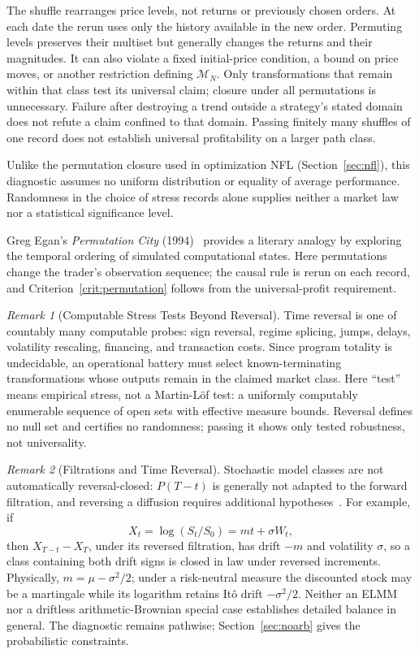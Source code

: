 \documentclass[aps,pra,reprint,superscriptaddress,amsmath,amssymb,floatfix]{revtex4-2}
\theoremstyle{plain}
\theoremstyle{definition}
\theoremstyle{remark}
\newtheorem{remark}{Remark}
\begin{document}
The shuffle rearranges price levels, not returns or previously chosen orders.
At each date the rerun uses only the history available in the new order.
Permuting levels preserves their multiset but generally changes the returns
and their magnitudes. It can also violate a fixed initial-price condition,
a bound on price moves, or another restriction defining \(\mathcal M_N\).
Only transformations that remain within that class test its universal claim;
closure under all permutations is unnecessary. Failure after destroying a
trend outside a strategy's stated domain does not refute a claim confined to
that domain. Passing finitely many shuffles of one record does not establish
universal profitability on a larger path class.

Unlike the permutation closure used in optimization NFL
(Section~\ref{sec:nfl}), this diagnostic assumes no uniform distribution or
equality of average performance. Randomness in the choice of stress records
alone supplies neither a market law nor a statistical significance level.

Greg Egan's \emph{Permutation City} (1994)~\cite{permutationcity} provides a
literary analogy by exploring the temporal ordering of simulated computational
states. Here permutations change the trader's observation sequence; the causal
rule is rerun on each record, and Criterion~\ref{crit:permutation} follows from
the universal-profit requirement.

\begin{remark}[Computable Stress Tests Beyond Reversal]
\label{rem:stressfamily}
Time reversal is one of countably many computable probes: sign reversal,
regime splicing, jumps, delays, volatility rescaling, financing, and transaction
costs. Since program totality is undecidable, an operational battery must select
known-terminating transformations whose outputs remain in the claimed market
class. Here ``test'' means empirical stress, not a Martin-L\"of test: a uniformly
computably enumerable sequence of open sets with effective measure bounds.
Reversal defines no null set and certifies no randomness; passing it shows only
tested robustness, not universality.
\end{remark}

\begin{remark}[Filtrations and Time Reversal]
Stochastic model classes are not automatically reversal-closed:
\(P(T-t)\) is generally not adapted to the forward filtration, and reversing a
diffusion requires additional hypotheses~\cite{HaussmannPardoux1986}. For
example, if
\[
  X_t=\log(S_t/S_0)=mt+\sigma W_t,
\]
then \(X_{T-t}-X_T\), under its reversed filtration, has drift \(-m\) and
volatility \(\sigma\), so a class containing both drift signs is closed in law
under reversed increments. Physically, \(m=\mu-\sigma^2/2\); under a
risk-neutral measure the discounted stock may be a martingale while its
logarithm retains It\^o drift \(-\sigma^2/2\). Neither an ELMM nor a driftless
arithmetic-Brownian special case establishes detailed balance in general. The
diagnostic remains pathwise; Section~\ref{sec:noarb} gives the probabilistic
constraints.
\end{remark}
\end{document}
